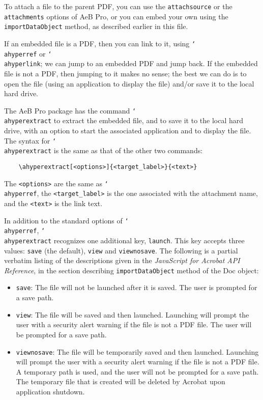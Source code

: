 \documentclass{article}
\newcommand{\cs}[1]{\texttt{\char`\\#1}}
\newcommand\newtopic{\par\ifdim\lastskip>0pt\relax\vskip-\lastskip\fi
\par\vskip6pt\noindent}
\begin{document}
To attach a file to the parent PDF, you can use the
\texttt{attachsource} or the \texttt{attachments} options of AeB
Pro, or you can embed your own using the \texttt{importDataObject}
method, as described earlier in this file.

If an embedded file is a PDF, then you can link to it, using
\cs{ahyperref} or \cs{ahyperlink}; we can jump to an embedded PDF
and jump back. If the embedded file is not a PDF, then jumping to it
makes no sense; the best we can do is to open the file (using an
application to display the file) and/or save it to the local hard
drive.

The AeB Pro package has the command \cs{ahyperextract} to extract
the embedded file, and to save it to the local hard drive, with an
option to start the associated application and to display the file.
The syntax for \cs{ahyperextract} is the same as that of the other two commands:
\begin{verbatim}
    \ahyperextract[<options>]{<target_label>}{<text>}
\end{verbatim}
\noindent The \texttt{<options>} are the same as \cs{ahyperref}, the \texttt{<target\_label>} is the one associated
with the attachment name, and the \texttt{<text>} is the link text.

\newtopic In addition to the standard options of \cs{ahyperref}, \cs{ahyperextract} recognizes one additional key, \texttt{launch}.
This key accepts three values: \texttt{save} (the default), \texttt{view} and \texttt{viewnosave}. The following is a
partial verbatim listing of the descriptions given in the \textsl{JavaScript for Acrobat API Reference}, in the section
describing \texttt{importDataObject} method of the Doc object:
\begin{itemize}
    \item \texttt{save}: The file will not be launched after it is saved. The user is prompted for a save path.
    \item \texttt{view}: The file will be saved and then launched.
        Launching will prompt the user with a security alert warning
        if the file is not a PDF file. The user will be prompted for a
        save path.
    \item \texttt{viewnosave}: The file will be temporarily saved and
        then launched. Launching will prompt the user with a security
        alert warning if the file is not a PDF file. A temporary path
        is used, and the user will not be prompted for a save path.
        The temporary file that is created will be deleted by Acrobat
        upon application shutdown.
\end{itemize}
\end{document}
